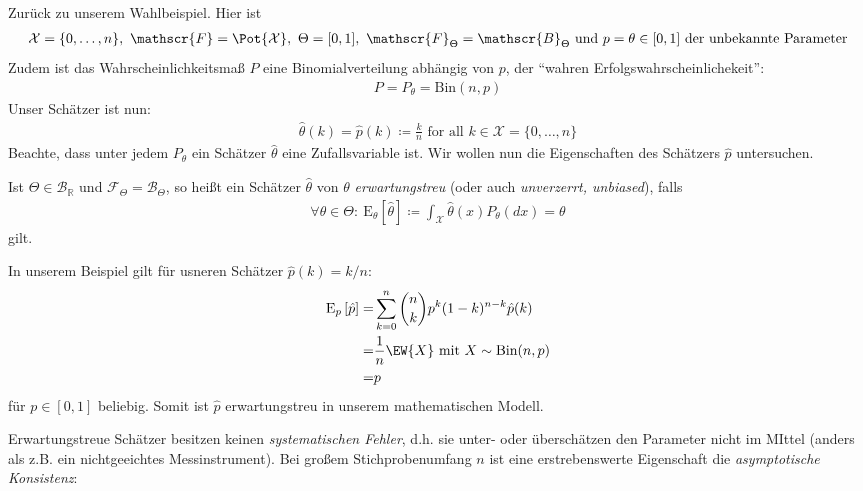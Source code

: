 \documentclass[a4paper]{scrartcl}
\begin{document}
		\begin{example}
			Zurück zu unserem Wahlbeispiel. Hier ist
			\begin{align*}
				\mathcal{X}=\{0,\dots,n\},~\mathscr{F}=\Pot{\mathcal{X}},~\Theta=[0,1],~\mathscr{F}_\Theta=\mathscr{B}_\Theta \text{ und }p=\theta\in[0,1]\text{ der unbekannte Parameter}
			\end{align*}
			Zudem ist das Wahrscheinlichkeitsmaß $P$ eine Binomialverteilung abhängig von $p$, der "`wahren Erfolgswahrscheinlichekeit"':
			\begin{align*}
				P=P_\theta=\text{Bin}(n,p)
			\end{align*}
			Unser Schätzer ist nun:
			\begin{align*}
				\hat{\theta}(k)=\hat{p}(k)\coloneq\frac{k}{n}\text{ for all }k\in\mathcal{X}=\{0,\dots,n\}
			\end{align*}
			Beachte, dass unter jedem $P_\theta$ ein Schätzer $\hat{\theta}$ eine Zufallsvariable ist. Wir wollen nun die Eigenschaften des Schätzers $\hat{p}$ untersuchen.
		\end{example}
		\begin{definition}
			Ist $\Theta\in\mathscr{B}_\mathbb{R}$ und $\mathscr{F}_\Theta=\mathscr{B}_\Theta$, so heißt ein Schätzer $\hat{\theta}$ von $\theta$ \emph{erwartungstreu} (oder auch \emph{unverzerrt, unbiased}), falls
			\begin{align*}
				\forall\theta\in\Theta\colon~\mathrm{E}_\theta\left[\hat{\theta}\right]\coloneq \int_\mathcal{X}\hat{\theta}(x)P_\theta(dx)=\theta
			\end{align*}
			gilt.
		\end{definition}
		\begin{example}
			In unserem Beispiel gilt für usneren Schätzer $\hat{p}(k)=k/n$:
			\begin{align*}
				\mathrm{E}_p\left[\hat{p}\right]=&\sum_{k=0}^n\binom{n}{k}p^k(1-k)^{n-k}\hat{p}(k)\\
				=&\frac{1}{n}\EW{X}\text{ mit }X\sim\text{Bin}(n,p)\\
				=&p
			\end{align*}
			für $p\in[0,1]$ beliebig. Somit ist $\hat{p}$ erwartungstreu in unserem mathematischen Modell.
		\end{example}
		\begin{remark}
			Erwartungstreue Schätzer besitzen keinen \emph{systematischen Fehler}, d.h. sie unter- oder überschätzen den Parameter nicht im MIttel (anders als z.B. ein nichtgeeichtes Messinstrument). Bei großem Stichprobenumfang $n$ ist eine erstrebenswerte Eigenschaft die \emph{asymptotische Konsistenz}:
		\end{remark}
\end{document}
